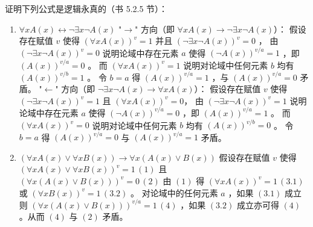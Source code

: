 \documentclass[UTF8]{ctexart}
\begin{document}
    \section{}

    证明下列公式是逻辑永真的（书 5.2.5 节）：

    \begin{enumerate}
        \item $\forall x A(x) \leftrightarrow \lnot \exists x \lnot A(x)$ \newline
        "$\rightarrow$" 方向（即 $\forall x A(x) \to \lnot \exists x \lnot A(x)$）： \newline
        假设存在赋值 $v$ 使得 $(\forall x A(x))^v=1$ 并且 $(\lnot \exists x \lnot A(x))^v=0$ ，\newline
        由 $(\lnot \exists x \lnot A(x))^v=0$ 说明论域中存在元素 $a$ 使得 $(\lnot A(x))^{v/a}=1$ ，即 $(A(x))^{v/a}=0$ 。\newline
        而 $(\forall x A(x))^v=1$ 说明对论域中任何元素 $b$ 均有 $(A(x))^{v/b}=1$ 。\newline
        令 $b=a$ 得 $(A(x))^{v/a}=1$ ，与 $(A(x))^{v/a}=0$ 矛盾。 \newline
        "$\leftarrow$" 方向（即 $\lnot \exists x \lnot A(x) \to \forall x A(x)$）：\newline
        假设存在赋值 $v$ 使得 $(\lnot \exists x \lnot A(x))^v=1$ 且 $(\forall x A(x))^v=0$， \newline
        由 $(\lnot \exists x \lnot A(x))^v=1$ 说明论域中存在元素 $a$ 使得 $(\lnot A(x))^{v/a}=0$ ，即 $(A(x))^{v/a}=1$ 。\newline
        而 $(\forall x A(x))^v=0$ 说明对论域中任何元素 $b$ 均有 $(A(x))^{v/b}=0$ 。\newline
        令 $b=a$ 得 $(A(x))^{v/a}=0$ 与 $(A(x))^{v/a}=1$ 矛盾。
        \item $(\forall x A(x) \lor \forall x B(x)) \to \forall x (A(x) \lor B(x))$ \newline
        假设存在赋值 $v$ 使得 $(\forall x A(x) \lor \forall x B(x))^v=1\, (1)$ 
        且 $(\forall x (A(x) \lor B(x)))^v=0 \, (2)$
        由 $(1)$ 得 $(\forall x A(x))^v=1\, (3.1)$ 或 $(\forall x B(x))^v=1\, (3.2)$ 。\newline
        对论域中的任何元素 $a$ ，如果 $(3.1)$ 成立则 $(\forall x (A(x) \lor B(x)))^{v/a}=1 \, (4)$ ，如果 $(3.2)$ 成立亦可得 $(4)$ 。从而 $(4)$ 与 $(2)$ 矛盾。
    \end{enumerate}

    \section{}
\end{document}
